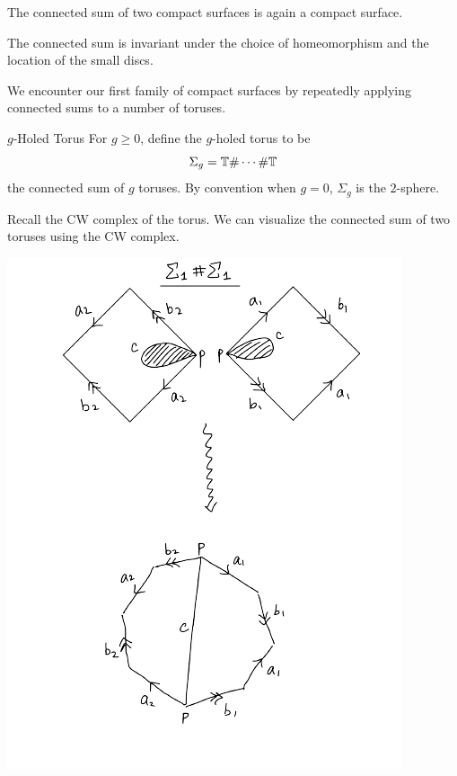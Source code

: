 \documentclass[a4paper]{article}
\begin{document}
\begin{lmm}{}{} The connected sum of two compact surfaces is again a compact surface. 
\end{lmm}

\begin{prp}{}{} The connected sum is invariant under the choice of homeomorphism and the location of the small discs. 
\end{prp}

We encounter our first family of compact surfaces by repeatedly applying connected sums to a number of toruses. 

\begin{defn}{$g$-Holed Torus}{} For $g\geq 0$, define the $g$-holed torus to be $$\Sigma_g=\mathbb{T}\#\cdots\#\mathbb{T}$$ the connected sum of $g$ toruses. By convention when $g=0$, $\Sigma_g$ is the $2$-sphere. 
\end{defn}

Recall the CW complex of the torus. We can visualize the connected sum of two toruses using the CW complex. 

\begin{center}
\includegraphics[scale = 0.8]{Image 1}
\end{center}
\end{document}
